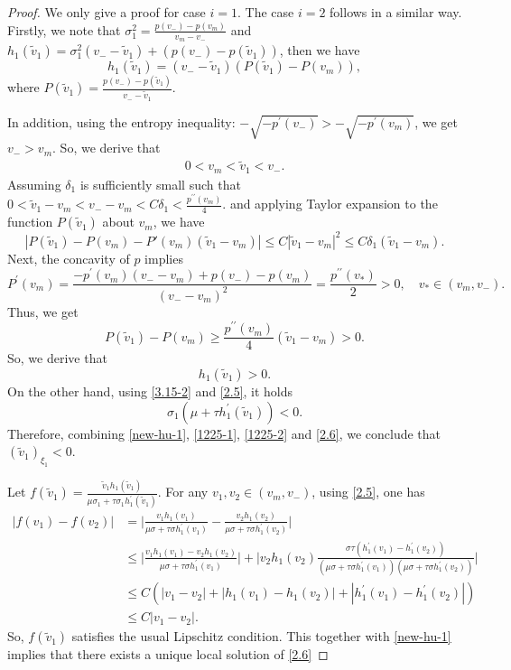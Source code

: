 \documentclass[10pt,reqno]{amsart}
\numberwithin{equation}{section}
\begin{document}
\begin{proof}
We only give a proof for case $i=1$. The case $i=2$ follows in a similar way.
Firstly, we note that $\sigma^2_1=\frac{p(v_-)-p(v_m)}{v_m-v_-}$ and $h_1(\widetilde{v}_1)=\sigma_1^2(v_--\widetilde{v}_1)+(p(v_-)-p(\widetilde{v}_1))$, then we have
\[
h_1(\widetilde{v}_1)=(v_--\widetilde{v}_1)\left(P(\widetilde{v}_1)-P(v_m)\right),
\]
where $P(\widetilde{v}_1)=\frac{p(v_-)-p(\widetilde{v}_1)}{v_--\widetilde{v}_1}$.

In addition, using the entropy inequality: $-\sqrt{-p^{\prime}(v_-)}>-\sqrt{-p^{\prime}(v_m)}$, we get $v_->v_m$. So, we derive that
\begin{align}\label{new-hu-1}
0<	v_m<\widetilde{v}_1<v_-.
\end{align}
 Assuming $\delta_1$ is sufficiently small such that 
$
0 < \widetilde{v}_1 - v_m < v_- - v_m < C\delta_1<\frac{p^{\prime\prime}(v_m)}{4}.
$
and applying Taylor expansion to the function $P(\widetilde{v}_1)$ about $v_m$, we have  
\[
|P(\widetilde{v}_1)- P(v_m)- P'(v_m)(\widetilde{v}_1 - v_m)| \le C|\widetilde{v}_1 - v_m|^2 \le C\delta_1 (\widetilde{v}_1 - v_m).
\]
Next, the concavity of $p$ implies
\[
P^{\prime}(v_m)=\frac{-p^{\prime}(v_m)(v_--v_m)+p(v_-)-p(v_m)}
{(v_--v_m)^2}
=\frac{p^{\prime\prime}(v_\ast)}{2}>0, \quad v_\ast\in(v_m, v_-).
\]
 Thus, we get 
 \[
 P(\widetilde{v}_1)- P(v_m)\geq \frac{p^{\prime\prime}(v_m)}{4}(\widetilde{v}_1 - v_m)>0.
 \]
So, we derive that
 \begin{equation}\label{1225-1}
h_1(\widetilde v_1)>0.
\end{equation}
On the other hand, using \eqref{3.15-2} and \eqref{2.5}, it holds
\begin{equation}\label{1225-2}
	\sigma_1(\mu+\tau h^\prime_1(\widetilde{v}_1))<0.
\end{equation}
Therefore, combining \eqref{new-hu-1}, \eqref{1225-1}, \eqref{1225-2} and \eqref{2.6}, we conclude that 
 $(\widetilde{v}_1)_{\xi_1}<0$.


Let $f(\widetilde{v}_1)=\frac{\widetilde{v}_1h_1(\widetilde{v}_1)}{\mu\sigma_1+\tau\sigma_1 h^{\prime}_1(\widetilde{v}_1)}$. For any $v_1,v_2\in(v_m,v_-)$, using \eqref{2.5}, one has
\begin{align*}
|f(v_1)-f(v_2)|&=\Big|\frac{v_1h_1(v_1)}{\mu\sigma+\tau\sigma h_1^{\prime}(v_1)}-\frac{v_2h_1(v_2)}{\mu\sigma+\tau\sigma h_1^{\prime}(v_2)}\Big|\\
&\le \Big|\frac{v_1h_1(v_1)-v_2h_1(v_2)}{\mu\sigma+\tau\sigma h_1^{\prime}(v_1)}\Big|
+\Big|v_2h_1(v_2)\frac{\sigma\tau\left(h_1^{\prime}(v_1)-h_1^{\prime}(v_2)\right)}
{(\mu\sigma+\tau\sigma h_1^{\prime}(v_1))(\mu\sigma+\tau\sigma h_1^{\prime}(v_2))}\Big|\\
&\le C\left(|v_1-v_2|+|h_1(v_1)-h_1(v_2)|+|h_1^{\prime}(v_1)-h_1^{\prime}(v_2)|\right)\\
&\le C|v_1-v_2|.
\end{align*}
So, $f(\widetilde{v}_1)$ satisfies the usual Lipschitz condition. This together with \eqref{new-hu-1} implies that there exists a unique local solution of \eqref{2.6}


\end{proof}
\end{document}
